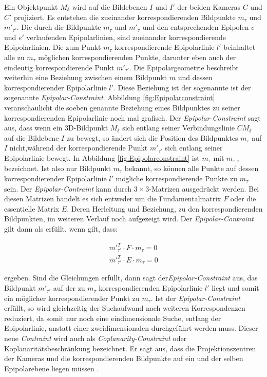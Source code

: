 Ein Objektpunkt $M_\delta$ wird auf die Bildebenen $I$ und $I'$ der beiden Kameras $C$ und $C'$ projiziert. Es entstehen die zueinander korrespondierenden Bildpunkte $m_\tau$ und $m'_{\tau'}$. Die durch die Bildpunkte $m_\tau$ und $m'_{\tau}$ und den entsprechenden Epipolen $e$ und $e'$ verlaufenden Epipolarlinien, sind zueinander korrespondierende Epipolarlinien. Die zum Punkt $m_\tau$ korrespondierende Epipolarlinie $l'$ beinhaltet alle zu $m_\tau$ möglichen korrespondierenden Punkte, darunter eben auch der eindeutig korrespondierende Punkt $m'_{\tau'}$. Die Epipolargeometrie beschreibt weiterhin eine Beziehung zwischen einem Bildpunkt $m$ und dessen korrespondierender Epipolarlinie $l'$. Diese Beziehung ist der sogenannte ist der sogenannte \textit{Epipolar-Constraint}\cite{HZ,Zhang2014,ZZGXr}. Abbildung \ref{fig:Epipolarconstraint} veranschaulicht die soeben genannte Beziehung eines Bildpunktes zu seiner korrespondierenden Epipolarlinie noch mal grafisch. Der \textit{Epipolar-Constraint} sagt aus, dass wenn ein 3D-Bildpunkt $M_\delta$ sich entlang seiner Verbindungslinie $\overline{CM_\delta}$ auf die Bildebene $I$ zu bewegt, so ändert sich die Position des Bildpunktes $m_\tau$ auf $I$ nicht,während der korrespondierende Punkt $m'_{\tau'}$ sich entlang seiner Epipolarlinie bewegt. In Abbildung \ref{fig:Epipolarconstraint} ist $m_\tau$ mit $m_{\tau,i}$ bezeichnet. Ist also nur Bildpunkt $m_\tau$ bekannt, so können alle Punkte auf dessen korrespondierender Epipolarlinie $l'$ mögliche korrespondierende Punkte zu $m_\tau$ sein. Der \textit{Epipolar-Contraint} kann durch $3 \times 3$-Matrizen ausgedrückt werden. Bei diesen Matrizen handelt es sich entweder um die Fundamentalmatrix $F$ oder die essentielle Matrix $E$\cite{HZ,ZZGXr,Elements,CamerModels.,Zhang2014}. Deren Herleitung und Beziehung, zu den korrespondierenden Bildpunkten, im weiteren Verlauf noch aufgezeigt wird. Der \textit{Epipolar-Contraint} gilt dann als erfüllt, wenn gilt, dass:



\begin{gather}
	m'^T_{\tau'} \cdot F \cdot m_\tau = 0\\
	\bar{m}'^T_{\tau'} \cdot E \cdot \bar{m}_{\tau} = 0
\end{gather}

ergeben. Sind die Gleichungen erfüllt, dann sagt der\textit{Epipolar-Constraint} aus, das Bildpunkt  $m'_{\tau'}$ auf der zu $m_\tau$ korrespondierenden Epipolarlinie $l'$ liegt und somit ein möglicher korrespondierender Punkt zu $m_\tau$\cite{HZ,Zhang2014,Elements,ZZGXr}. Ist der \textit{Epipolar-Constraint} erfüllt, so wird gleichzeitig der Suchaufwand nach weiteren Korrespondenzen reduziert, da somit nur noch eine eindimensionale Suche, entlang der Epipolarlinie, anstatt einer zweidimensionalen durchgeführt werden muss. Dieser neue \textit{Contraint} wird auch als \textit{Coplanarity-Constraint} oder Koplanaritätsbeschränkung bezeichnet. Er sagt aus, dass die Projektionszentren der Kameras und die korrespondierenden Bildpunkte auf ein und der selben Epipolarebene liegen müssen \cite{Zhang2014}.


